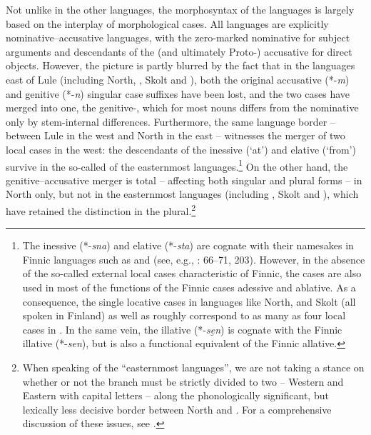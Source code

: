 \documentclass[output=paper]{LSP/langsci}
\begin{document}
 Not unlike in the other  languages, the morphosyntax of the  languages is largely based on the interplay of morphological cases. All  languages are explicitly nominative–accusative languages, with the zero-marked nominative for subject arguments and descendants of the  (and ultimately Proto-) accusative for direct objects. However, the picture is partly blurred by the fact that in the  languages east of Lule  (including North, , Skolt and ), both the original accusative (*-\textit{m}) and genitive (*-\textit{n}) singular case suffixes have been lost, and the two cases have merged into one, the genitive-, which for most nouns differs from the nominative only by stem-internal differences. Furthermore, the same language border – between Lule  in the west and North  in the east – witnesses the merger of two local cases in the west: the descendants of the  inessive (‘at’) and elative (‘from’) survive in the so-called  of the easternmost languages.\footnote{The  inessive (*-\textit{sna}) and elative (*-\textit{sta}) are cognate with their namesakes in Finnic languages such as  and  (see, e.g., \citealt{Sammallahti1998Saami}: 66–71, 203). However, in the absence of the so-called external local cases characteristic of Finnic, the  cases are also used in most of the functions of the Finnic cases adessive and ablative. As a consequence, the single locative cases in languages like North,  and Skolt  (all spoken in Finland) as well as  roughly correspond to as many as four local cases in . In the same vein, the  illative (*-\textit{se̮n}) is cognate with the Finnic illative (*-\textit{sen}), but is also a functional equivalent of the Finnic allative.} On the other hand, the genitive–accusative merger is total – affecting both singular and plural forms – in North  only, but not in the easternmost languages (including , Skolt and ), which have retained the distinction in the plural.\footnote{When speaking of the “easternmost  languages”, we are not taking a stance on whether or not the  branch must be strictly divided to two – Western  and Eastern  with capital letters – along the phonologically significant, but lexically less decisive border between North  and  . For a comprehensive discussion of these issues, see \citet{Rydving2013Words}.}
\end{document}
